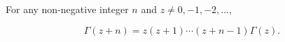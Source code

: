 For any non-negative integer $n$ and $z \neq 0, -1, -2, \ldots$,

$$\Gamma(z+n) = z(z+1) \cdots (z+n-1) \Gamma(z).$$
